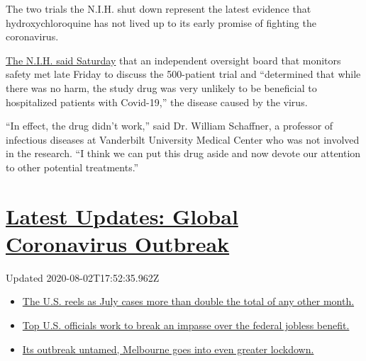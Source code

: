 The two trials the N.I.H. shut down represent the latest evidence that
hydroxychloroquine has not lived up to its early promise of fighting the
coronavirus.

\href{https://www.nih.gov/news-events/news-releases/nih-halts-clinical-trial-hydroxychloroquine}{The
N.I.H. said Saturday} that an independent oversight board that monitors
safety met late Friday to discuss the 500-patient trial and ``determined
that while there was no harm, the study drug was very unlikely to be
beneficial to hospitalized patients with Covid-19,'' the disease caused
by the virus.

``In effect, the drug didn't work,'' said Dr. William Schaffner, a
professor of infectious diseases at Vanderbilt University Medical Center
who was not involved in the research. ``I think we can put this drug
aside and now devote our attention to other potential treatments.''

\hypertarget{latest-updates-global-coronavirus-outbreak}{%
\section{\texorpdfstring{\href{https://www.nytimes.com/2020/08/01/world/coronavirus-covid-19.html?action=click\&pgtype=Article\&state=default\&region=MAIN_CONTENT_1\&context=storylines_live_updates}{Latest
Updates: Global Coronavirus
Outbreak}}{Latest Updates: Global Coronavirus Outbreak}}\label{latest-updates-global-coronavirus-outbreak}}

Updated 2020-08-02T17:52:35.962Z

\begin{itemize}
\tightlist
\item
  \href{https://www.nytimes.com/2020/08/01/world/coronavirus-covid-19.html?action=click\&pgtype=Article\&state=default\&region=MAIN_CONTENT_1\&context=storylines_live_updates\#link-34047410}{The
  U.S. reels as July cases more than double the total of any other
  month.}
\item
  \href{https://www.nytimes.com/2020/08/01/world/coronavirus-covid-19.html?action=click\&pgtype=Article\&state=default\&region=MAIN_CONTENT_1\&context=storylines_live_updates\#link-780ec966}{Top
  U.S. officials work to break an impasse over the federal jobless
  benefit.}
\item
  \href{https://www.nytimes.com/2020/08/01/world/coronavirus-covid-19.html?action=click\&pgtype=Article\&state=default\&region=MAIN_CONTENT_1\&context=storylines_live_updates\#link-2bc8948}{Its
  outbreak untamed, Melbourne goes into even greater lockdown.}
\end{itemize}

